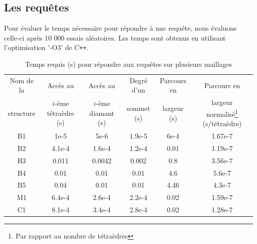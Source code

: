 \subsection{Les requêtes}
\noindent
Pour évaluer le temps nécessaire pour répondre à une requête, nous évaluons celle-ci après 10 000 essais aléatoires. Les temps sont obtenus en utilisant l'optimisation '-O3' de C\texttt{++}.
\begin{savenotes}
\begin{table}[h]
\footnotesize
\centering
\begin{tabular}{| c | c | c| c |c |c|}
\hline
Nom de la & Accès au& Accès au & Degré d'un & Parcours en & Parcours en\\
structure &$i$-ème tétraèdre (s)& $i$-ème diamant (s) &sommet (s)&largeur (s) & largeur normalisé\footnote{Par rapport au nombre de tétraèdres} (s/tétraèdre)\\
\hline
B1  & 1e-5 & 5e-6 & 1.9e-5 & 6e-4& 1.67e-7 \\
B2  &  4.1e-4 & 1.6e-4 & 1.2e-4 & 0.01& 1.19e-7\\
B3 & 0.011 & 0.0042 & 0.002 & 0.8&3.56e-7\\
B4 & 0.01 & 0.01 & 0.01 & 4.6&5.6e-7\\
B5 & 0.04 & 0.01 & 0.01 & 4.46& 4.3e-7 \\
M1  & 6.4e-4 & 2.6e-4 & 2.2e-4 & 0.02&1.59e-7\\
C1  & 8.1e-4 & 3.4e-4 & 2.8e-4 & 0.02&1.28e-7\\
\hline  
\end{tabular}
\label{table:results_time}
\caption{Temps requis (s) pour répondre aux requêtes sur plusieurs maillages}
\end{table}
\end{savenotes}
\noindent

